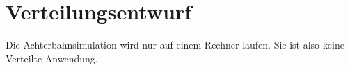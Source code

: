 \chapter{Verteilungsentwurf}
Die Achterbahnsimulation wird nur auf einem Rechner laufen. Sie ist also keine Verteilte Anwendung.